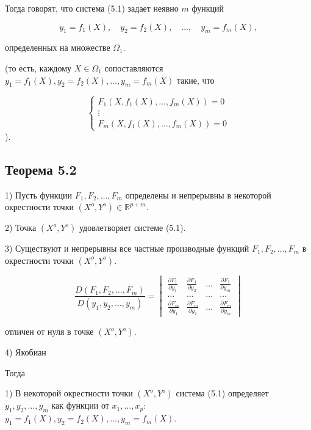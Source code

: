 {Тогда говорят, что система (5.1) задает неявно \( m \) функций  



\[
y_1 = f_1(X), \quad y_2 = f_2(X), \quad \dots, \quad y_m = f_m(X),
\]



определенных на множестве \( \Omega_1 \).  

(то есть, каждому \( X \in \Omega_1 \) сопоставляются \( y_1 = f_1(X), y_2 = f_2(X), \dots, y_m = f_m(X) \) такие, что  



\[
\begin{cases}
F_1(X, f_1(X), \dots, f_m(X)) = 0 \\
\vdots \\
F_m(X, f_1(X), \dots, f_m(X)) = 0
\end{cases}
\]
).


\subsection*{Теорема 5.2}

1) Пусть функции \( F_1, F_2, \dots, F_m \) определены и непрерывны в некоторой окрестности точки \( (X^o, Y^o) \in \mathbb{R}^{p+m} \).

2) Точка \( (X^o, Y^o) \) удовлетворяет системе (5.1).

3) Существуют и непрерывны все частные производные функций \( F_1, F_2, \dots, F_m \) в окрестности точки \( (X^o, Y^o) \).



\[
\frac{D(F_1, F_2, \dots, F_m)}{D(y_1, y_2, \dots, y_m)} =
\begin{vmatrix}
\frac{\partial F_1}{\partial y_1} & \frac{\partial F_1}{\partial y_2} & \dots & \frac{\partial F_1}{\partial y_m} \\
\dots & \dots & \dots & \dots \\
\frac{\partial F_m}{\partial y_1} & \frac{\partial F_m}{\partial y_2} & \dots & \frac{\partial F_m}{\partial y_m}
\end{vmatrix}
\]



отличен от нуля в точке \( (X^o, Y^o) \).

4) Якобиан

Тогда

1) В некоторой окрестности точки \( (X^o, Y^o) \) система (5.1) определяет \( y_1, y_2, \dots, y_m \) как функции от \( x_1, \dots, x_p \): \( y_1 = f_1(X), y_2 = f_2(X), \dots, y_m = f_m(X) \).

}
